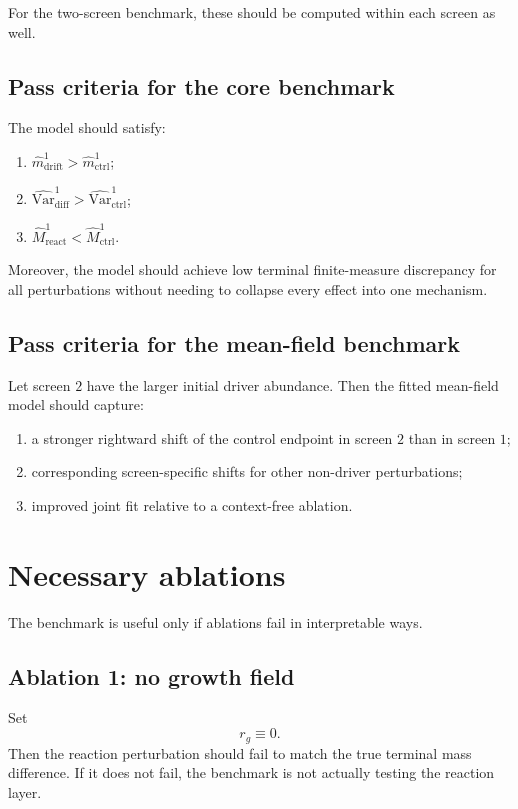 \documentclass[11pt]{article}
\newcommand{\Var}{\mathrm{Var}}
\begin{document}
For the two-screen benchmark, these should be computed within each screen as well.

\subsection{Pass criteria for the core benchmark}

The model should satisfy:
\begin{enumerate}[label=(\roman*),leftmargin=2.2em]
    \item \(\hat m_{\mathrm{drift}}^1 > \hat m_{\mathrm{ctrl}}^1\);
    \item \(\widehat{\Var}_{\mathrm{diff}}^1 > \widehat{\Var}_{\mathrm{ctrl}}^1\);
    \item \(\hat M_{\mathrm{react}}^1 < \hat M_{\mathrm{ctrl}}^1\).
\end{enumerate}
Moreover, the model should achieve low terminal finite-measure discrepancy for all perturbations without needing to collapse every effect into one mechanism.

\subsection{Pass criteria for the mean-field benchmark}

Let screen \(2\) have the larger initial driver abundance. Then the fitted mean-field model should capture:
\begin{enumerate}[label=(\roman*),leftmargin=2.2em]
    \item a stronger rightward shift of the control endpoint in screen \(2\) than in screen \(1\);
    \item corresponding screen-specific shifts for other non-driver perturbations;
    \item improved joint fit relative to a context-free ablation.
\end{enumerate}

\section{Necessary ablations}

The benchmark is useful only if ablations fail in interpretable ways.

\subsection{Ablation 1: no growth field}

Set
\[
r_g \equiv 0.
\]
Then the reaction perturbation should fail to match the true terminal mass difference. If it does not fail, the benchmark is not actually testing the reaction layer.
\end{document}
